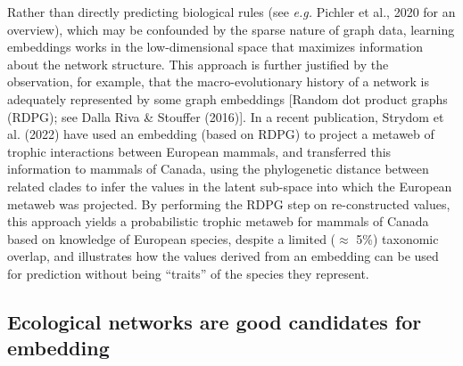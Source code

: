 \documentclass[11pt]{article}
\begin{document}
Rather than directly predicting biological rules (see \emph{e.g.}
Pichler et al., 2020 for an overview), which may be confounded by the
sparse nature of graph data, learning embeddings works in the
low-dimensional space that maximizes information about the network
structure. This approach is further justified by the observation, for
example, that the macro-evolutionary history of a network is adequately
represented by some graph embeddings {[}Random dot product graphs
(RDPG); see Dalla Riva \& Stouffer (2016){]}. In a recent publication,
Strydom et al. (2022) have used an embedding (based on RDPG) to project
a metaweb of trophic interactions between European mammals, and
transferred this information to mammals of Canada, using the
phylogenetic distance between related clades to infer the values in the
latent sub-space into which the European metaweb was projected. By
performing the RDPG step on re-constructed values, this approach yields
a probabilistic trophic metaweb for mammals of Canada based on knowledge
of European species, despite a limited (\(\approx\) 5\%) taxonomic
overlap, and illustrates how the values derived from an embedding can be
used for prediction without being ``traits'' of the species they
represent.

\hypertarget{ecological-networks-are-good-candidates-for-embedding}{%
\subsection{Ecological networks are good candidates for
embedding}\label{ecological-networks-are-good-candidates-for-embedding}}
\end{document}
